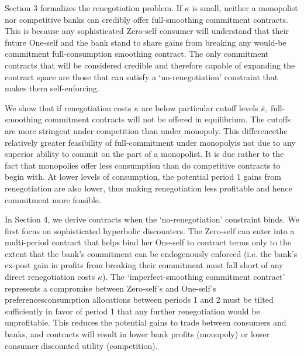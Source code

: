 \documentclass[11pt,english]{article}
\theoremstyle{plain}
\theoremstyle{definition}
\begin{document}
Section 3 formalizes the renegotiation problem. If $\kappa$ is small,
neither a monopolist nor competitive banks can credibly offer full-smoothing
commitment contracts. This is because any sophisticated Zero-self
consumer will understand that their future One-self and the bank stand
to share gains from breaking any would-be commitment full-consumption
smoothing contract. The only commitment contracts that will be considered
credible and therefore capable of expanding the contract space are
those that can satisfy a `no-renegotiation' constraint that makes
them self-enforcing. 

We show that if renegotiation costs $\kappa$ are below particular
cutoff levels $\bar{\kappa}$, full-smoothing commitment contracts
will not be offered in equilibrium. The cutoffs are more stringent
under competition than under monopoly. This difference\textendash the
relatively greater feasibility of full-commitment under monopoly\textendash is
not due to any superior ability to commit on the part of a monopolist.
It is due rather to the fact that monopolies offer less consumption
than do competitive contracts to begin with. At lower levels of consumption,
the potential period 1 gains from renegotiation are also lower, thus
making renegotiation less profitable and hence commitment more feasible.

In Section 4, we derive contracts when the `no-renegotiation' constraint
binds. We first focus on sophisticated hyperbolic discounters. The
Zero-self can enter into a multi-period contract that helps bind her
One-self to contract terms only to the extent that the bank's commitment
can be endogenously enforced (i.e. the bank's ex-post gain in profits
from breaking their commitment must fall short of any direct renegotiation
costs $\kappa$). The `imperfect-smoothing commitment contract' represents
a compromise between Zero-self's and One-self's preferences\textendash consumption
allocations between periods 1 and 2 must be tilted sufficiently in
favor of period 1 that any further renegotiation would be unprofitable.
This reduces the potential gains to trade between consumers and banks,
and contracts will result in lower bank profits (monopoly) or lower
consumer discounted utility (competition).
\end{document}
